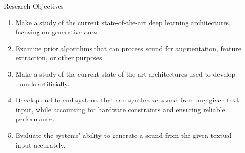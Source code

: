 \begin{frame}{Research Objectives}
    \begin{enumerate}
        \item Make a study of the current state-of-the-art deep learning architectures, focusing on generative ones.
        \item Examine prior algorithms that can process sound for augmentation, feature extraction, or other purposes.
        \item Make a study of the current state-of-the-art architectures used to develop sounds artificially.
        \item Develop end-to-end systems that can synthesize sound from any given text input, while accounting for hardware constraints and ensuring reliable performance.
        \item Evaluate the systems’ ability to generate a sound from the given textual input accurately.
    \end{enumerate}
\end{frame}